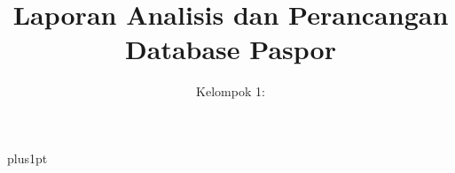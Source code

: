 \documentclass[12pt]{ociamthesis}
\title{Laporan Analisis dan Perancangan Database Paspor\\[1ex]  }
\author{ Kelompok 1:\\[2ex] }
\begin{document}
\baselineskip=18pt plus1pt

\setcounter{secnumdepth}{3}
\setcounter{tocdepth}{3}
\maketitle

\begin{romanpages}
\tableofcontents
\listoffigures
\end{romanpages}


%

\end{document}
